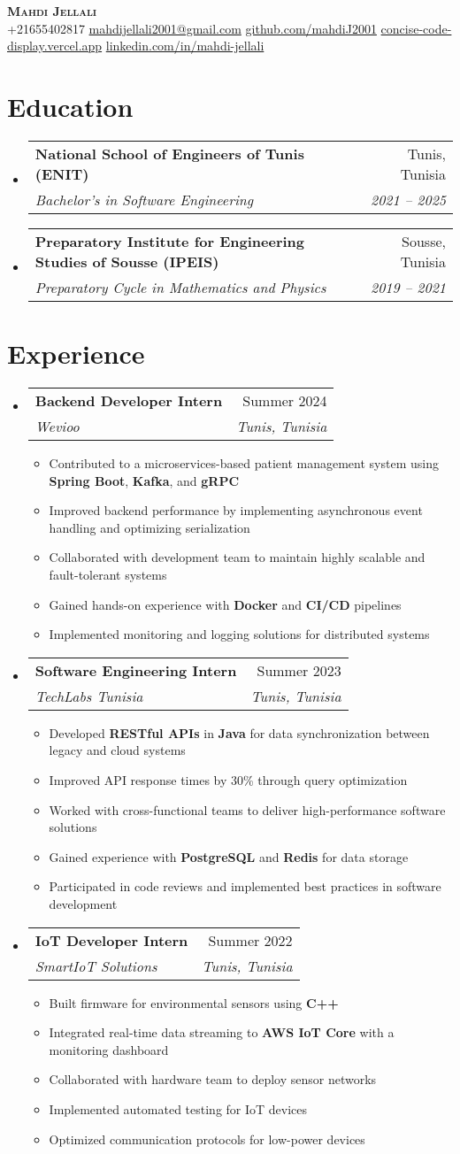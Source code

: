 \documentclass[letterpaper,11pt]{article}
\makeatletter
\newcommand{\resumeItem}[1]{
    \item\small{
            {#1 \vspace{-2pt}}
    }
}
\newcommand{\resumeSubheading}[4]{
    \vspace{-2pt}\item
    \begin{tabular*}{0.97\textwidth}[t]{l@{\extracolsep{\fill}}r}
    \textbf{#1} & #2 \\
    \textit{\small#3} & \textit{\small #4} \\
    \end{tabular*}\vspace{-7pt}
}
\newcommand{\resumeSubHeadingListStart}{\begin{itemize}[leftmargin=0.15in, label={}]}
\newcommand{\resumeSubHeadingListEnd}{\end{itemize}}
\newcommand{\resumeItemListStart}{\begin{itemize}}
\newcommand{\resumeItemListEnd}{\end{itemize}\vspace{-5pt}}
\makeatother
\begin{document}
\begin{center}
\textbf{\Huge \scshape Mahdi Jellali} \\ \vspace{1pt}
\small
+21655402817 \quad
\href{mailto:mahdijellali2001@gmail.com}{mahdijellali2001@gmail.com} \quad
\href{https://github.com/mahdiJ2001}{github.com/mahdiJ2001} \quad
\href{https://concise-code-display.vercel.app/}{concise-code-display.vercel.app} \quad
\href{https://www.linkedin.com/in/mahdi-jellali/}{linkedin.com/in/mahdi-jellali}
\end{center}

\vspace{10pt}
\section{Education}
\resumeSubHeadingListStart
\resumeSubheading
{National School of Engineers of Tunis (ENIT)}{Tunis, Tunisia}
{Bachelor’s in Software Engineering}{2021 -- 2025}
\resumeSubheading
{Preparatory Institute for Engineering Studies of Sousse (IPEIS)}{Sousse, Tunisia}
{Preparatory Cycle in Mathematics and Physics}{2019 -- 2021}
\resumeSubHeadingListEnd

\section{Experience}
\resumeSubHeadingListStart
\resumeSubheading
{Backend Developer Intern}{Summer 2024}
{Wevioo}{Tunis, Tunisia}
\resumeItemListStart
\resumeItem{Contributed to a microservices-based patient management system using \textbf{Spring Boot}, \textbf{Kafka}, and \textbf{gRPC}}
\resumeItem{Improved backend performance by implementing asynchronous event handling and optimizing serialization}
\resumeItem{Collaborated with development team to maintain highly scalable and fault-tolerant systems}
\resumeItem{Gained hands-on experience with \textbf{Docker} and \textbf{CI/CD} pipelines}
\resumeItem{Implemented monitoring and logging solutions for distributed systems}
\resumeItemListEnd
\resumeSubheading
{Software Engineering Intern}{Summer 2023}
{TechLabs Tunisia}{Tunis, Tunisia}
\resumeItemListStart
\resumeItem{Developed \textbf{RESTful APIs} in \textbf{Java} for data synchronization between legacy and cloud systems}
\resumeItem{Improved API response times by 30\% through query optimization}
\resumeItem{Worked with cross-functional teams to deliver high-performance software solutions}
\resumeItem{Gained experience with \textbf{PostgreSQL} and \textbf{Redis} for data storage}
\resumeItem{Participated in code reviews and implemented best practices in software development}
\resumeItemListEnd
\resumeSubheading
{IoT Developer Intern}{Summer 2022}
{SmartIoT Solutions}{Tunis, Tunisia}
\resumeItemListStart
\resumeItem{Built firmware for environmental sensors using \textbf{C++}}
\resumeItem{Integrated real-time data streaming to \textbf{AWS IoT Core} with a monitoring dashboard}
\resumeItem{Collaborated with hardware team to deploy sensor networks}
\resumeItem{Implemented automated testing for IoT devices}
\resumeItem{Optimized communication protocols for low-power devices}
\resumeItemListEnd
\resumeSubHeadingListEnd
\end{document}
